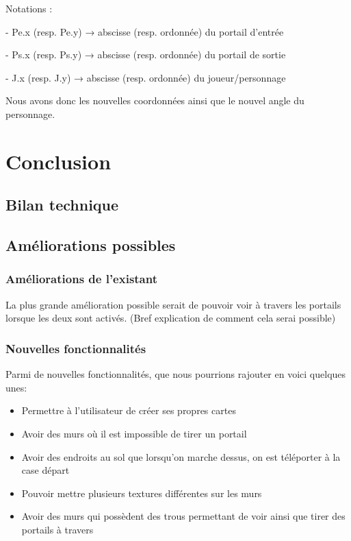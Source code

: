 \documentclass[11pt]{article}
\begin{document}
Notations :

- Pe.x (resp. Pe.y) → abscisse (resp. ordonnée) du portail d’entrée

- Ps.x (resp. Ps.y) → abscisse (resp. ordonnée) du portail de sortie

- J.x (resp. J.y) → abscisse (resp. ordonnée) du joueur/personnage

Nous avons donc les nouvelles coordonnées ainsi que le nouvel angle du personnage.

\section{Conclusion}
\subsection{Bilan technique}
\subsection{Améliorations possibles}
\subsubsection{Améliorations de l'existant}

La plus grande amélioration possible serait de pouvoir voir à travers les portails
lorsque les deux sont activés. (Bref explication de comment cela serai possible)

\subsubsection{Nouvelles fonctionnalités}

Parmi de nouvelles fonctionnalités, que nous pourrions rajouter en voici quelques unes:
\begin{itemize}
	\item Permettre à l'utilisateur de créer ses propres cartes
	\item Avoir des murs où il est impossible de tirer un portail
	\item Avoir des endroits au sol que lorsqu'on marche dessus, on est téléporter à la case départ
	\item Pouvoir mettre plusieurs textures différentes sur les murs
	\item Avoir des murs qui possèdent des trous permettant de voir ainsi que tirer des portails à travers
\end{itemize}



\end{document}
